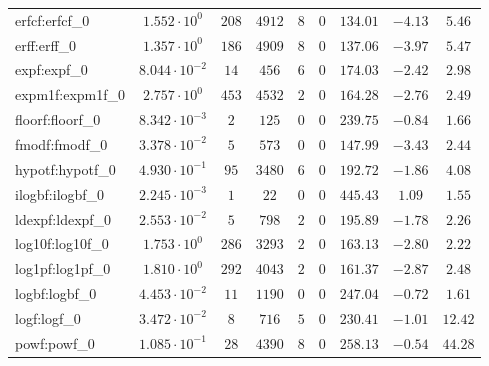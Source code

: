 \begin{tabular}{|l|c|c|c|c|c|c|c|c|}
erfcf:erfcf\_0               & $ 1.552 \cdot 10^{0}  $ & $ 208    $ & $ 4912   $ & $ 8   $ & $ 0   $ & $ 134.01      $ & $ -4.13   $ & $ 5.46    $ \\
erff:erff\_0                 & $ 1.357 \cdot 10^{0}  $ & $ 186    $ & $ 4909   $ & $ 8   $ & $ 0   $ & $ 137.06      $ & $ -3.97   $ & $ 5.47    $ \\
expf:expf\_0                 & $ 8.044 \cdot 10^{-2} $ & $ 14     $ & $ 456    $ & $ 6   $ & $ 0   $ & $ 174.03      $ & $ -2.42   $ & $ 2.98    $ \\
expm1f:expm1f\_0             & $ 2.757 \cdot 10^{0}  $ & $ 453    $ & $ 4532   $ & $ 2   $ & $ 0   $ & $ 164.28      $ & $ -2.76   $ & $ 2.49    $ \\
floorf:floorf\_0             & $ 8.342 \cdot 10^{-3} $ & $ 2      $ & $ 125    $ & $ 0   $ & $ 0   $ & $ 239.75      $ & $ -0.84   $ & $ 1.66    $ \\
fmodf:fmodf\_0               & $ 3.378 \cdot 10^{-2} $ & $ 5      $ & $ 573    $ & $ 0   $ & $ 0   $ & $ 147.99      $ & $ -3.43   $ & $ 2.44    $ \\
hypotf:hypotf\_0             & $ 4.930 \cdot 10^{-1} $ & $ 95     $ & $ 3480   $ & $ 6   $ & $ 0   $ & $ 192.72      $ & $ -1.86   $ & $ 4.08    $ \\
ilogbf:ilogbf\_0             & $ 2.245 \cdot 10^{-3} $ & $ 1      $ & $ 22     $ & $ 0   $ & $ 0   $ & $ 445.43      $ & $ 1.09    $ & $ 1.55    $ \\
ldexpf:ldexpf\_0             & $ 2.553 \cdot 10^{-2} $ & $ 5      $ & $ 798    $ & $ 2   $ & $ 0   $ & $ 195.89      $ & $ -1.78   $ & $ 2.26    $ \\
log10f:log10f\_0             & $ 1.753 \cdot 10^{0}  $ & $ 286    $ & $ 3293   $ & $ 2   $ & $ 0   $ & $ 163.13      $ & $ -2.80   $ & $ 2.22    $ \\
log1pf:log1pf\_0             & $ 1.810 \cdot 10^{0}  $ & $ 292    $ & $ 4043   $ & $ 2   $ & $ 0   $ & $ 161.37      $ & $ -2.87   $ & $ 2.48    $ \\
logbf:logbf\_0               & $ 4.453 \cdot 10^{-2} $ & $ 11     $ & $ 1190   $ & $ 0   $ & $ 0   $ & $ 247.04      $ & $ -0.72   $ & $ 1.61    $ \\
logf:logf\_0                 & $ 3.472 \cdot 10^{-2} $ & $ 8      $ & $ 716    $ & $ 5   $ & $ 0   $ & $ 230.41      $ & $ -1.01   $ & $ 12.42   $ \\
powf:powf\_0                 & $ 1.085 \cdot 10^{-1} $ & $ 28     $ & $ 4390   $ & $ 8   $ & $ 0   $ & $ 258.13      $ & $ -0.54   $ & $ 44.28   $ \\

\end{tabular}
